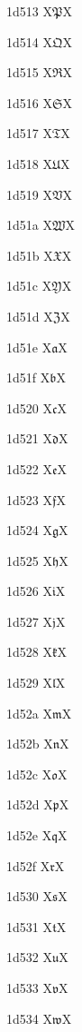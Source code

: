 \documentclass[11pt]{article}
\begin{document}
1d513 X{\ensuremath{\mathfrak{P}}}X

1d514 X{\ensuremath{\mathfrak{Q}}}X

1d515 X{\ensuremath{\mathfrak{R}}}X

1d516 X{\ensuremath{\mathfrak{S}}}X

1d517 X{\ensuremath{\mathfrak{T}}}X

1d518 X{\ensuremath{\mathfrak{U}}}X

1d519 X{\ensuremath{\mathfrak{V}}}X

1d51a X{\ensuremath{\mathfrak{W}}}X

1d51b X{\ensuremath{\mathfrak{X}}}X

1d51c X{\ensuremath{\mathfrak{Y}}}X

1d51d X{\ensuremath{\mathfrak{Z}}}X

1d51e X{\ensuremath{\mathfrak{a}}}X

1d51f X{\ensuremath{\mathfrak{b}}}X

1d520 X{\ensuremath{\mathfrak{c}}}X

1d521 X{\ensuremath{\mathfrak{d}}}X

1d522 X{\ensuremath{\mathfrak{e}}}X

1d523 X{\ensuremath{\mathfrak{f}}}X

1d524 X{\ensuremath{\mathfrak{g}}}X

1d525 X{\ensuremath{\mathfrak{h}}}X

1d526 X{\ensuremath{\mathfrak{i}}}X

1d527 X{\ensuremath{\mathfrak{j}}}X

1d528 X{\ensuremath{\mathfrak{k}}}X

1d529 X{\ensuremath{\mathfrak{l}}}X

1d52a X{\ensuremath{\mathfrak{m}}}X

1d52b X{\ensuremath{\mathfrak{n}}}X

1d52c X{\ensuremath{\mathfrak{o}}}X

1d52d X{\ensuremath{\mathfrak{p}}}X

1d52e X{\ensuremath{\mathfrak{q}}}X

1d52f X{\ensuremath{\mathfrak{r}}}X

1d530 X{\ensuremath{\mathfrak{s}}}X

1d531 X{\ensuremath{\mathfrak{t}}}X

1d532 X{\ensuremath{\mathfrak{u}}}X

1d533 X{\ensuremath{\mathfrak{v}}}X

1d534 X{\ensuremath{\mathfrak{w}}}X
\end{document}
